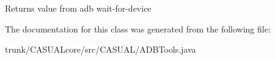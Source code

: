 \begin{DoxyReturn}{Returns}
value from adb wait-\/for-\/device 
\end{DoxyReturn}


The documentation for this class was generated from the following file\-:\begin{DoxyCompactItemize}
\item 
trunk/\-C\-A\-S\-U\-A\-Lcore/src/\-C\-A\-S\-U\-A\-L/A\-D\-B\-Tools.\-java\end{DoxyCompactItemize}
